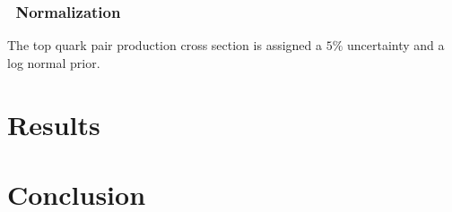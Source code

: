 

\subsubsection{\ttbar\ Normalization}
\label{sec:Toponium_Normalization}
The top quark pair production cross section is assigned a $5\%$ uncertainty and a log normal prior.

\section{Results}

\section{Conclusion}